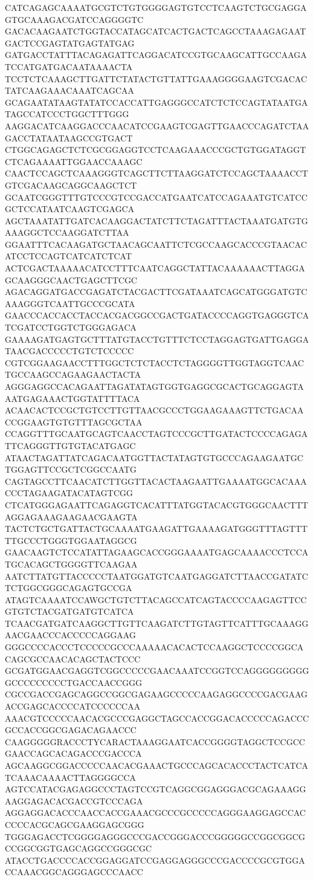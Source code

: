 CATCAGAGCAAAATGCGTCTGTGGGGAGTGTCCTCAAGTCTGCGAGGAGTGCAAAGACGATCCAGGGGTC
GACACAAGAATCTGGTACCATAGCATCACTGACTCAGCCTAAAGAGAATGACTCCGAGTATGAGTATGAG
GATGACCTATTTACAGAGATTCAGGACATCCGTGCAAGCATTGCCAAGATCCATGATGACAATAAAACTA
TCCTCTCAAAGCTTGATTCTATACTGTTATTGAAAGGGGAAGTCGACACTATCAAGAAACAAATCAGCAA
GCAGAATATAAGTATATCCACCATTGAGGGCCATCTCTCCAGTATAATGATAGCCATCCCTGGCTTTGGG
AAGGACATCAAGGACCCAACATCCGAAGTCGAGTTGAACCCAGATCTAAGACCTATAATAAGCCGTGACT
CTGGCAGAGCTCTCGCGGAGGTCCTCAAGAAACCCGCTGTGGATAGGTCTCAGAAAATTGGAACCAAAGC
CAACTCCAGCTCAAAGGGTCAGCTTCTTAAGGATCTCCAGCTAAAACCTGTCGACAAGCAGGCAAGCTCT
GCAATCGGGTTTGTCCCGTCCGACCATGAATCATCCAGAAATGTCATCCGCTCCATAATCAAGTCGAGCA
AGCTAAATATTGATCACAAGGACTATCTTCTAGATTTACTAAATGATGTGAAAGGCTCCAAGGATCTTAA
GGAATTTCACAAGATGCTAACAGCAATTCTCGCCAAGCACCCGTAACACATCCTCCAGTCATCATCTCAT
ACTCGACTAAAAACATCCTTTCAATCAGGCTATTACAAAAAACTTAGGAGCAAGGGCAACTGAGCTTCGC
AGACAGGATGACCGAGATCTACGACTTCGATAAATCAGCATGGGATGTCAAAGGGTCAATTGCCCGCATA
GAACCCACCACCTACCACGACGGCCGACTGATACCCCAGGTGAGGGTCATCGATCCTGGTCTGGGAGACA
GAAAAGATGAGTGCTTTATGTACCTGTTTCTCCTAGGAGTGATTGAGGATAACGACCCCCTGTCTCCCCC
CGTCGGAAGAACCTTTGGCTCTCTACCTCTAGGGGTTGGTAGGTCAACTGCCAAGCCAGAAGAACTACTA
AGGGAGGCCACAGAATTAGATATAGTGGTGAGGCGCACTGCAGGAGTAAATGAGAAACTGGTATTTTACA
ACAACACTCCGCTGTCCTTGTTAACGCCCTGGAAGAAAGTTCTGACAACCGGAAGTGTGTTTAGCGCTAA
CCAGGTTTGCAATGCAGTCAACCTAGTCCCGCTTGATACTCCCCAGAGATTCAGGGTTGTGTACATGAGC
ATAACTAGATTATCAGACAATGGTTACTATAGTGTGCCCAGAAGAATGCTGGAGTTCCGCTCGGCCAATG
CAGTAGCCTTCAACATCTTGGTTACACTAAGAATTGAAAATGGCACAAACCCTAGAAGATACATAGTCGG
CTCATGGGAGAATTCAGAGGTCACATTTATGGTACACGTGGGCAACTTTAGGAGAAAGAAGAACGAAGTA
TACTCTGCTGATTACTGCAAAATGAAGATTGAAAAGATGGGTTTAGTTTTTGCCCTGGGTGGAATAGGCG
GAACAAGTCTCCATATTAGAAGCACCGGGAAAATGAGCAAAACCCTCCATGCACAGCTGGGGTTCAAGAA
AATCTTATGTTACCCCCTAATGGATGTCAATGAGGATCTTAACCGATATCTCTGGCGGGCAGAGTGCCGA
ATAGTCAAAATCCAWGCTGTCTTACAGCCATCAGTACCCCAAGAGTTCCGTGTCTACGATGATGTCATCA
TCAACGATGATCAAGGCTTGTTCAAGATCTTGTAGTTCATTTGCAAAGGAACGAACCCACCCCCAGGAAG
GGGCCCCACCCTCCCCCGCCCAAAAACACACTCCAAGGCTCCCCGGCACAGCGCCAACACAGCTACTCCC
GCGATGGAACGAGGTCGGCCCCCGAACAAATCCGGTCCAGGGGGGGGGGCCCCCCCCCTGACCAACCGGG
CGCCGACCGAGCAGGCCGGCGAGAAGCCCCCAAGAGGCCCCGACGAAGACCGAGCACCCCATCCCCCCAA
AAACGTCCCCCAACACGCCCGAGGCTAGCCACCGGACACCCCCAGACCCGCCACCGGCGAGACAGAACCC
CAAGGGGGRACCCTYCARACTAAAGGAATCACCGGGGTAGGCTCCGCCGAACCAGCACAGACCCGACCCA
AGCAAGGCGGACCCCCAACACGAAACTGCCCAGCACACCCTACTCATCATCAAACAAAACTTAGGGGCCA
AGTCCATACGAGAGGCCCTAGTCCGTCAGGCGGAGGGACGCAGAAAGGAAGGAGACACGACCGTCCCAGA
AGGAGGACACCCAACCACCGAAACGCCCGCCCCCAGGGAAGGAGCCACCCCCACGCAGCGAAGGAGCGGG
TGGGAGACCTCGGGGAGGGCCCGACCGGGACCCGGGGGCCGGCGGCGCCGGCGGTGAGCAGGCCGGGCGC
ATACCTGACCCCACCGGAGGATCCGAGGAGGGCCCGACCCCGCGTGGACCAAACGGCAGGGAGCCCAACC

